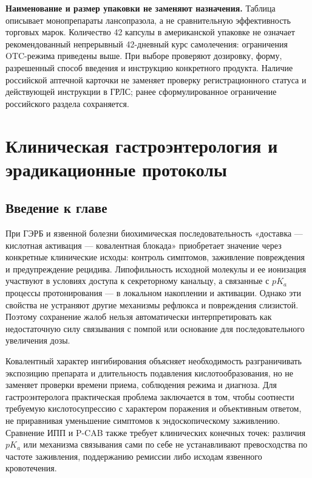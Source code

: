 \documentclass[11pt,a4paper,notitlepage]{report}
\newcommand{\src}[1]{\unskip\space\cite{#1}}
\begin{document}
\textbf{Наименование и размер упаковки не заменяют назначения.} Таблица описывает монопрепараты лансопразола, а не сравнительную эффективность торговых марок. Количество 42 капсулы в американской упаковке не означает рекомендованный непрерывный 42-дневный курс самолечения: ограничения OTC-режима приведены выше. При выборе проверяют дозировку, форму, разрешенный способ введения и инструкцию конкретного продукта. Наличие российской аптечной карточки не заменяет проверку регистрационного статуса и действующей инструкции в ГРЛС; ранее сформулированное ограничение российского раздела сохраняется.\src{otc,uslabel,grls}

\chapter{Клиническая гастроэнтерология и эрадикационные протоколы}
\label{chap:gastroenterology}

\section*{Введение к главе}
При ГЭРБ и язвенной болезни биохимическая последовательность «доставка --- кислотная активация --- ковалентная блокада» приобретает значение через конкретные клинические исходы: контроль симптомов, заживление повреждения и предупреждение рецидива. Липофильность исходной молекулы и ее ионизация участвуют в условиях доступа к секреторному канальцу, а связанные с $pK_a$ процессы протонирования --- в локальном накоплении и активации. Однако эти свойства не устраняют другие механизмы рефлюкса и повреждения слизистой. Поэтому сохранение жалоб нельзя автоматически интерпретировать как недостаточную силу связывания с помпой или основание для последовательного увеличения дозы.\src{molchem,molnagaya90,acggerd,agagerd}

Ковалентный характер ингибирования объясняет необходимость разграничивать экспозицию препарата и длительность подавления кислотообразования, но не заменяет проверки времени приема, соблюдения режима и диагноза. Для гастроэнтеролога практическая проблема заключается в том, чтобы соотнести требуемую кислотосупрессию с характером поражения и объективным ответом, не приравнивая уменьшение симптомов к эндоскопическому заживлению. Сравнение ИПП и P-CAB также требует клинических конечных точек: различия $pK_a$ или механизма связывания сами по себе не устанавливают превосходства по частоте заживления, поддержанию ремиссии либо исходам язвенного кровотечения.\src{molrestore,acggerd,agagerd,vontrial,esge2026}
\end{document}
